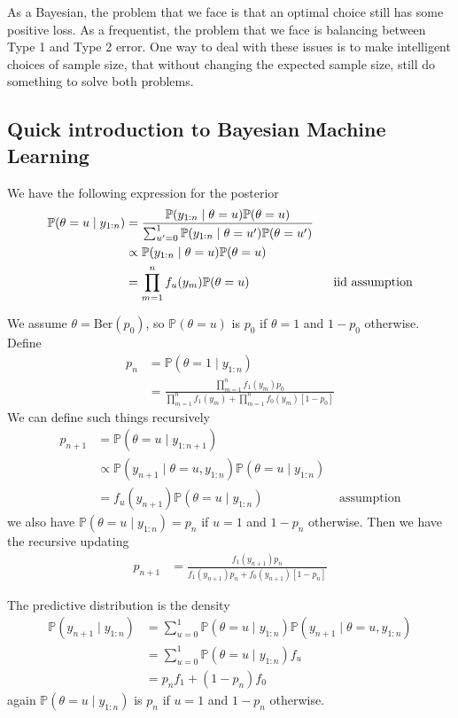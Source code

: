 \documentclass[pdftex,letterpaper,11pt]{article}
\theoremstyle{definition}
\theoremstyle{definition}
\theoremstyle{definition}
\newcommand{\PP}{\mathbb P}
\newcommand{\mrm}[1]{\mathrm{#1}}
\begin{document}
As a Bayesian, the problem that we face is that an optimal choice still has some positive loss. As a frequentist, the problem that we face is balancing between Type 1 and Type 2 error. One way to deal with these issues is to make intelligent choices of sample size, that without changing the expected sample size, still do something to solve both problems.

\subsection*{Quick introduction to Bayesian Machine Learning}

We have the following expression for the posterior
\begin{align*}
	\PP(\theta=u \mid y_{1:n}) & = \frac{\PP(y_{1:n}\mid \theta=u) \PP(\theta = u)}{\sum_{u'=0}^1 \PP(y_{1:n}\mid \theta=u') \PP(\theta=u')}\\
	& \propto \PP(y_{1:n}\mid \theta=u) \PP(\theta = u)\\
	& = \prod_{m=1}^n f_u(y_m) \PP(\theta=u) & \text{\; iid assumption}
\end{align*}

We assume $\theta = \mrm{Ber}(p_0)$, so $\PP(\theta = u)$ is $p_0$ if $\theta =1$ and $1-p_0$ otherwise. Define
\begin{align*}
	p_n & = \PP(\theta = 1 \mid y_{1:n})\\
		& = \frac{\prod_{m=1}^n f_1(y_m) p_0}{\prod_{m=1}^n f_1(y_m) + \prod_{m=1}^n f_0(y_m)[1-p_0]}
\end{align*}
We can define such things recursively
\begin{align*}
	p_{n+1} & = \PP(\theta=u \mid y_{1:n+1})\\
			& \propto \PP(y_{n+1} \mid \theta = u, y_{1:n}) \PP(\theta=u \mid y_{1:n})\\
			& = f_u(y_{n+1})\PP(\theta = u \mid y_{1:n}) & \text{ assumption}
\end{align*}
we also have $\PP(\theta = u \mid y_{1:n}) = p_n$ if $u=1$ and $1-p_n$ otherwise. Then we have the recursive updating
\begin{align*}
	p_{n+1} & = \frac{f_1(y_{n+1})p_n}{f_1(y_{n+1})p_n + f_0(y_{n+1})[1-p_n]}
\end{align*}

The predictive distribution is the density
\begin{align*}
	\PP(y_{n+1} \mid y_{1:n}) & = \sum_{u=0}^1 \PP(\theta=u \mid y_{1:n}) \PP(y_{n+1} \mid \theta=u,  y_{1:n})\\
	& = \sum_{u=0}^1 \PP(\theta=u \mid y_{1:n}) f_u\\
	& = p_n f_1 + (1-p_n) f_0
\end{align*}
again $\PP(\theta = u \mid y_{1:n})$ is $p_n$ if $u=1$ and $1-p_n$ otherwise.
\end{document}
